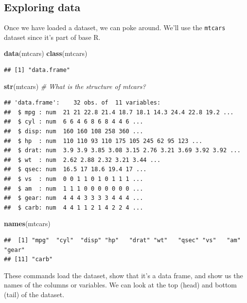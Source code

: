 \documentclass[]{article}
\newenvironment{Shaded}{\begin{snugshade}}{\end{snugshade}}
\newcommand{\KeywordTok}[1]{\textcolor[rgb]{0.13,0.29,0.53}{\textbf{#1}}}
\newcommand{\CommentTok}[1]{\textcolor[rgb]{0.56,0.35,0.01}{\textit{#1}}}
\newcommand{\NormalTok}[1]{#1}
\begin{document}
\subsection{Exploring data}\label{exploring-data}

Once we have loaded a dataset, we can poke around. We'll use the
\texttt{mtcars} dataset since it's part of base R.

\begin{Shaded}
\begin{Highlighting}[]
\KeywordTok{data}\NormalTok{(mtcars)}
\KeywordTok{class}\NormalTok{(mtcars)}
\end{Highlighting}
\end{Shaded}

\begin{verbatim}
## [1] "data.frame"
\end{verbatim}

\begin{Shaded}
\begin{Highlighting}[]
\KeywordTok{str}\NormalTok{(mtcars)  }\CommentTok{# What is the structure of mtcars?}
\end{Highlighting}
\end{Shaded}

\begin{verbatim}
## 'data.frame':    32 obs. of  11 variables:
##  $ mpg : num  21 21 22.8 21.4 18.7 18.1 14.3 24.4 22.8 19.2 ...
##  $ cyl : num  6 6 4 6 8 6 8 4 4 6 ...
##  $ disp: num  160 160 108 258 360 ...
##  $ hp  : num  110 110 93 110 175 105 245 62 95 123 ...
##  $ drat: num  3.9 3.9 3.85 3.08 3.15 2.76 3.21 3.69 3.92 3.92 ...
##  $ wt  : num  2.62 2.88 2.32 3.21 3.44 ...
##  $ qsec: num  16.5 17 18.6 19.4 17 ...
##  $ vs  : num  0 0 1 1 0 1 0 1 1 1 ...
##  $ am  : num  1 1 1 0 0 0 0 0 0 0 ...
##  $ gear: num  4 4 4 3 3 3 3 4 4 4 ...
##  $ carb: num  4 4 1 1 2 1 4 2 2 4 ...
\end{verbatim}

\begin{Shaded}
\begin{Highlighting}[]
\KeywordTok{names}\NormalTok{(mtcars)}
\end{Highlighting}
\end{Shaded}

\begin{verbatim}
##  [1] "mpg"  "cyl"  "disp" "hp"   "drat" "wt"   "qsec" "vs"   "am"   "gear"
## [11] "carb"
\end{verbatim}

These commands load the dataset, show that it's a data frame, and show
us the names of the columns or variables. We can look at the top (head)
and bottom (tail) of the dataset.
\end{document}
